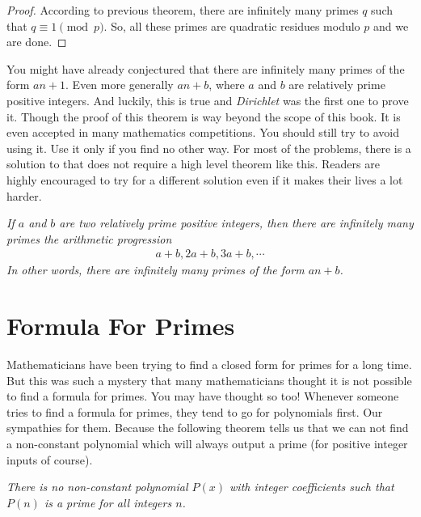 \documentclass{subfiles}
\begin{document}
		\begin{proof}
			According to previous theorem, there are infinitely many primes $q$ such that $q \equiv 1 \pmod p$. So, all these primes are quadratic residues modulo $p$ and we are done.
		\end{proof}
	You might have already conjectured that there are infinitely many primes of the form $an+1$. Even more generally $an+b$, where $a$ and $b$ are relatively prime positive integers. And luckily, this is true and \textit{Dirichlet} was the first one to prove it. Though the proof of this theorem is way beyond the scope of this book. It is even accepted in many mathematics competitions. You should still try to avoid using it. Use it only if you find no other way. For most of the problems, there is a solution to that does not require a high level theorem like this. Readers are highly encouraged to try for a different solution even if it makes their  lives a lot harder.
		\begin{theorem}\slshape
			If $a$ and $b$ are two relatively prime positive integers, then there are infinitely many primes the arithmetic progression
				\begin{align*}
					a+b, 2a+b, 3a+b, \cdots
				\end{align*}
			In other words, there are infinitely many primes of the form $an+b$.
		\end{theorem}
	\section{Formula For Primes}
		Mathematicians have been trying to find a closed form for primes for a long time. But this was such a mystery that many mathematicians thought it is not possible to find a formula for primes. You may have thought so too! Whenever someone tries to find a formula for primes, they tend to go for polynomials first. Our sympathies for them. Because the following theorem tells us that we can not find a non-constant polynomial which will always output a prime (for positive integer inputs of course).
			\begin{theorem}\slshape
				There is no non-constant polynomial $P(x)$ with integer coefficients such that $P(n)$ is a prime for all integers $n$.
			\end{theorem}
\end{document}
